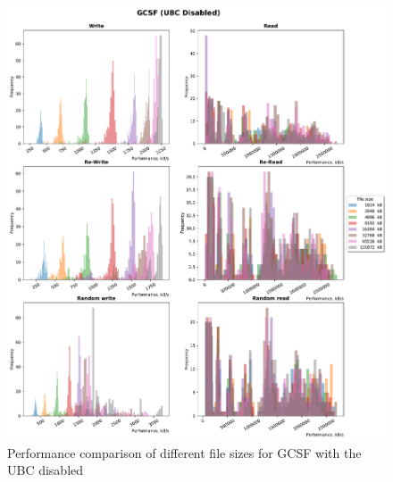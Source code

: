 \begin{figure}[!htb]
	\label{fig:bench_gcsf_without_cache}
	\begin{center}
		\includegraphics[width=1.0\textwidth]{figures.nosync/benchmarking/GCSF/GCSF-UBC Disabled-hist.pdf}
	\end{center}
	\caption{Performance comparison of different file sizes for GCSF with the UBC disabled}
\end{figure}


